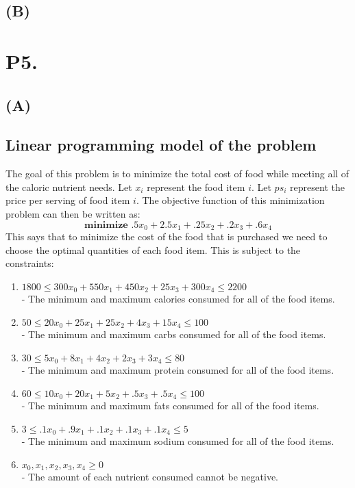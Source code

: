 \documentclass[12pt]{article}
\begin{document}
\subsection*{(B)}

\newpage

\section*{P5.}
\subsection*{(A)}
\subsection*{Linear programming model of the problem}
The goal of this problem is to minimize the total cost of food while meeting all of the caloric nutrient needs.  Let $x_{i}$ represent the food item $i$.  Let $ps_{i}$ represent the price per serving of food item $i$.  The objective function of this minimization problem can then be written as:
$$
  \textbf{minimize } .5x_{0} + 2.5x_{1} + .25x_{2} + .2x_{3} + .6x_{4}
$$
This says that to minimize the cost of the food that is purchased we need to choose the optimal quantities of each food item.  This is subject to the constraints:
\begin{enumerate}
\itemsep0em
  \item $1800 \leq 300x_{0} + 550x_{1} + 450x_{2} + 25x_{3} + 300x_{4} \leq 2200$\\
  - The minimum and maximum calories consumed for all of the food items.
  \item $50 \leq 20x_{0} + 25x_{1} + 25x_{2} + 4x_{3} + 15x_{4} \leq 100$\\
  - The minimum and maximum carbs consumed for all of the food items.
  \item $30 \leq 5x_{0} + 8x_{1} + 4x_{2} + 2x_{3} + 3x_{4} \leq 80$\\
  - The minimum and maximum protein consumed for all of the food items.
  \item $60 \leq 10x_{0} + 20x_{1} + 5x_{2} + .5x_{3} + .5x_{4} \leq 100$\\
  - The minimum and maximum fats consumed for all of the food items.
  \item $3 \leq .1x_{0} + .9x_{1} + .1x_{2} + .1x_{3} + .1x_{4} \leq 5$\\
  - The minimum and maximum sodium consumed for all of the food items.
  \item $x_{0}, x_{1}, x_{2}, x_{3}, x_{4} \geq 0$\\
  - The amount of each nutrient consumed cannot be negative.
\end{enumerate}
\end{document}
